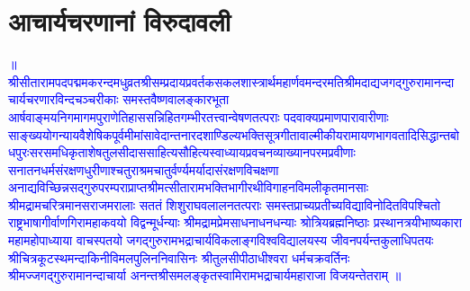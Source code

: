 %
%
%

\chapter[आचार्यचरणानां विरुदावली]{आचार्यचरणानां विरुदावली}

\fontsize{14}{21}\selectfont
\begin{center} \textcolor{blue}{॥ श्रीसीताराम\-पदपद्म\-मकरन्द\-मधुव्रत\-श्रीसम्प्रदाय\-प्रवर्तक\-सकल\-शास्त्रार्थ\-महार्णव\-मन्दरमति\-श्रीमदाद्य\-जगद्गुरु\-रामानन्दाचार्य\-चरणारविन्द\-चञ्चरीकाः समस्त\-वैष्णवालङ्कार\-भूता आर्षवाङ्मय\-निगमागम\-पुराणेतिहास\-सन्निहित\-गम्भीर\-तत्त्वान्वेषण\-तत्पराः पदवाक्य\-प्रमाण\-पारावारीणाः साङ्ख्ययोग\-न्यायवैशेषिक\-पूर्वमीमांसा\-वेदान्त\-नारद\-शाण्डिल्य\-भक्तिसूत्र\-गीता\-वाल्मीकीय\-रामायण\-भागवतादि\-सिद्धान्तबोध\-पुरःसर\-समधिकृताशेष\-तुलसीदास\-साहित्य\-सौहित्य\-स्वाध्याय\-प्रवचन\-व्याख्यान\-परमप्रवीणाः सनातन\-धर्म\-संरक्षण\-धुरीणाश्चतुराश्रम\-चातुर्वर्ण्य\-मर्यादा\-संरक्षण\-विचक्षणा अनाद्यविच्छिन्न\-सद्गुरु\-परम्परा\-प्राप्त\-श्रीमत्सीताराम\-भक्तिभागीरथी\-विगाहन\-विमलीकृत\-मानसाः श्रीमद्रामचरित्र\-मानस\-राजमरालाः सततं शिशुराघव\-लालनतत्पराः समस्त\-प्राच्य\-प्रतीच्य\-विद्या\-विनोदित\-विपश्चितो राष्ट्रभाषा\-गीर्वाणगिरा\-महाकवयो विद्वन्मूर्धन्याः श्रीमद्राम\-प्रेमसाधना\-धनधन्याः श्रोत्रिय\-ब्रह्मनिष्ठाः प्रस्थानत्रयी\-भाष्यकारा महामहोपाध्याया वाचस्पतयो जगद्गुरु\-रामभद्राचार्य\-विकलाङ्ग\-विश्वविद्यालयस्य जीवन\-पर्यन्त\-कुलाधिपतयः श्रीचित्रकूटस्थ\-मन्दाकिनी\-विमलपुलिन\-निवासिनः श्रीतुलसी\-पीठाधीश्वरा धर्मचक्रवर्तिनः श्रीमज्जगद्गुरु\-रामानन्दाचार्या अनन्तश्री\-समलङ्कृत\-स्वामिरामभद्राचार्य\-महाराजा विजयन्तेतराम् ॥}\end{center}
